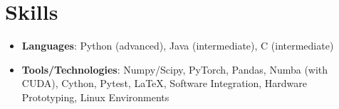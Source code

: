 \documentclass[letterpaper,11pt]{article}
\newcommand{\resumeItem}[2]{
  \item\small{
    \textbf{#1}{: #2 \vspace{-2pt}}
  }
}
\newcommand{\resumeItemListStart}{\begin{itemize}}
\newcommand{\resumeItemListEnd}{\end{itemize}\vspace{-5pt}}
\newenvironment{resumeItemList}{\resumeItemListStart}{\resumeItemListEnd}
\begin{document}
\section{Skills}
  \begin{resumeItemList}
    \resumeItem{Languages}{Python (advanced), Java (intermediate), C (intermediate)}
    \resumeItem{Tools/Technologies}{Numpy/Scipy, PyTorch, Pandas, Numba (with CUDA), Cython, Pytest, \LaTeX,
                                    Software Integration, Hardware Prototyping, Linux Environments} %
  \end{resumeItemList}
\end{document}
